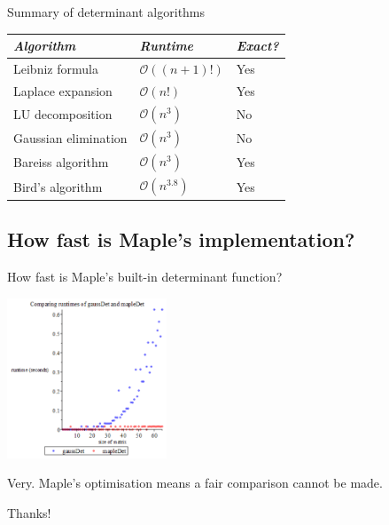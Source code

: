 \documentclass{beamer}
\begin{document}
\begin{frame}{Summary of determinant algorithms}

    \begin{center}
        \begin{tabular}{l l l}
            \toprule
            \emph{Algorithm}     & \emph{Runtime}           & \emph{Exact?} \\
            \midrule
            Leibniz formula      & $\mathcal{O}((n+1)!)$    & Yes \\
            Laplace expansion    & $\mathcal{O}(n!)$        & Yes \\
            LU decomposition     & $\mathcal{O}(n^3)$       & No \\
            Gaussian elimination & $\mathcal{O}(n^3)$       & No \\
            Bareiss algorithm    & $\mathcal{O}(n^3)$       & Yes \\
            Bird's algorithm     & $\mathcal{O}(n^{3.8})$   & Yes \\
            \bottomrule
        \end{tabular}
    \end{center}

\end{frame}

\subsection{How fast is Maple's implementation?}

\begin{frame}{How fast is Maple's built-in determinant function?}

    \begin{center}{}
        \includegraphics[height=180]{gauss-maple}
    \end{center}
    Very. Maple's optimisation means a fair comparison cannot be made.

\end{frame}

\begin{frame}

    \begin{center}
        \Huge{Thanks!}
    \end{center}

\end{frame}
\end{document}
